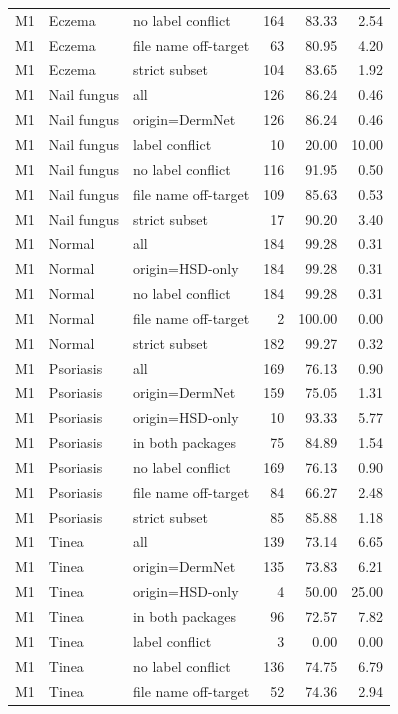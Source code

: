 \begin{tabular}{lllrrr}
M1 & Eczema & no label conflict & 164 & 83.33 & 2.54 \\
M1 & Eczema & file name off-target & 63 & 80.95 & 4.20 \\
M1 & Eczema & strict subset & 104 & 83.65 & 1.92 \\
M1 & Nail fungus & all & 126 & 86.24 & 0.46 \\
M1 & Nail fungus & origin=DermNet & 126 & 86.24 & 0.46 \\
M1 & Nail fungus & label conflict & 10 & 20.00 & 10.00 \\
M1 & Nail fungus & no label conflict & 116 & 91.95 & 0.50 \\
M1 & Nail fungus & file name off-target & 109 & 85.63 & 0.53 \\
M1 & Nail fungus & strict subset & 17 & 90.20 & 3.40 \\
M1 & Normal & all & 184 & 99.28 & 0.31 \\
M1 & Normal & origin=HSD-only & 184 & 99.28 & 0.31 \\
M1 & Normal & no label conflict & 184 & 99.28 & 0.31 \\
M1 & Normal & file name off-target & 2 & 100.00 & 0.00 \\
M1 & Normal & strict subset & 182 & 99.27 & 0.32 \\
M1 & Psoriasis & all & 169 & 76.13 & 0.90 \\
M1 & Psoriasis & origin=DermNet & 159 & 75.05 & 1.31 \\
M1 & Psoriasis & origin=HSD-only & 10 & 93.33 & 5.77 \\
M1 & Psoriasis & in both packages & 75 & 84.89 & 1.54 \\
M1 & Psoriasis & no label conflict & 169 & 76.13 & 0.90 \\
M1 & Psoriasis & file name off-target & 84 & 66.27 & 2.48 \\
M1 & Psoriasis & strict subset & 85 & 85.88 & 1.18 \\
M1 & Tinea & all & 139 & 73.14 & 6.65 \\
M1 & Tinea & origin=DermNet & 135 & 73.83 & 6.21 \\
M1 & Tinea & origin=HSD-only & 4 & 50.00 & 25.00 \\
M1 & Tinea & in both packages & 96 & 72.57 & 7.82 \\
M1 & Tinea & label conflict & 3 & 0.00 & 0.00 \\
M1 & Tinea & no label conflict & 136 & 74.75 & 6.79 \\
M1 & Tinea & file name off-target & 52 & 74.36 & 2.94 \\

\end{tabular}
